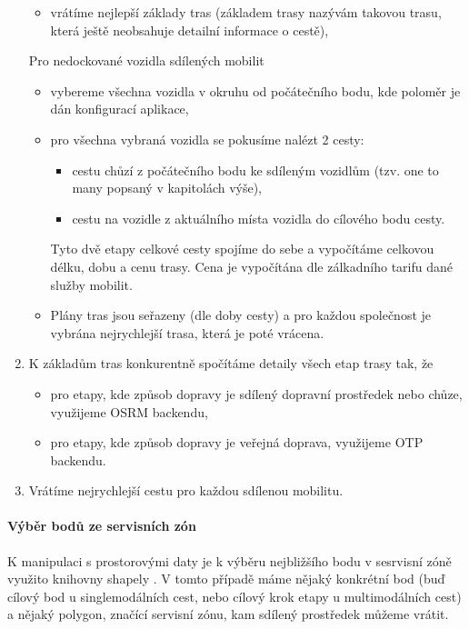 \documentclass[thesis=M,czech]{FITthesis}[2019/12/23]
\theoremstyle{plain}
\theoremstyle{definition}
\begin{document}
\begin{enumerate}
\begin{itemize}
		\item vrátíme nejlepší základy tras (základem trasy nazývám takovou trasu, která ještě neobsahuje detailní informace o cestě),
	\end{itemize}
	Pro nedockované vozidla sdílených mobilit
	\begin{itemize}
		\item vybereme všechna vozidla v okruhu od počátečního bodu, kde poloměr je dán konfigurací aplikace,
		\item pro všechna vybraná vozidla se pokusíme nalézt 2 cesty:
		\begin{itemize}
			\item cestu chůzí z počátečního bodu ke sdíleným vozidlům (tzv. one to many popsaný v kapitolách výše),
			\item cestu na vozidle z aktuálního místa vozidla do cílového bodu cesty.
		\end{itemize}
		Tyto dvě etapy celkové cesty spojíme do sebe a vypočítáme celkovou délku, dobu a cenu trasy. Cena je vypočítána dle zálkadního tarifu dané služby mobilit.
		\item Plány tras jsou seřazeny (dle doby cesty) a pro každou společnost je vybrána nejrychlejší trasa, která je poté vrácena.
	
	\end{itemize}
	\item K základům tras konkurentně spočítáme detaily všech etap trasy tak, že
		\begin{itemize}
			\item pro etapy, kde způsob dopravy je sdílený dopravní prostředek nebo chůze, využijeme OSRM backendu,
			\item pro etapy, kde způsob dopravy je veřejná doprava, využijeme OTP backendu.
		\end{itemize}
	\item Vrátíme nejrychlejší cestu pro každou sdílenou mobilitu.


\end{enumerate}


\paragraph{Výběr bodů ze servisních zón}\label{vyber-zon}

K manipulaci s prostorovými daty je k výběru nejbližšího bodu v sesrvisní zóně využito knihovny shapely \cite{shapely}. V tomto případě máme nějaký konkrétní bod (buď  cílový bod u singlemodálních cest, nebo cílový krok etapy u multimodálních cest) a nějaký polygon, značící servisní zónu, kam sdílený prostředek můžeme vrátit.
\end{document}
